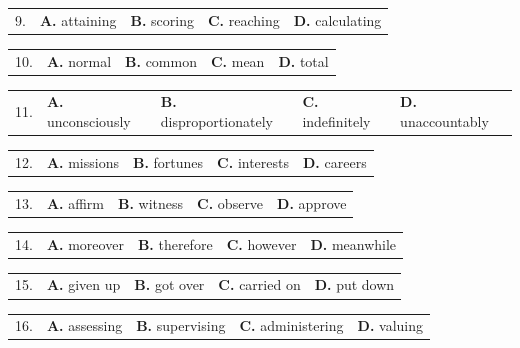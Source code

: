 \documentclass[UTF8,11pt]{ctexart}
\begin{document}
\noindent\begin{tabularx}{\linewidth}{@{}lXXXX@{}}9. & \textbf{A.} attaining & \textbf{B.} scoring & \textbf{C.} reaching & \textbf{D.} calculating\\\end{tabularx}\par

\noindent\begin{tabularx}{\linewidth}{@{}lXXXX@{}}10. & \textbf{A.} normal & \textbf{B.} common & \textbf{C.} mean & \textbf{D.} total\\\end{tabularx}\par

\noindent\begin{tabularx}{\linewidth}{@{}lXXXX@{}}11. & \textbf{A.} unconsciously & \textbf{B.} disproportionately & \textbf{C.} indefinitely & \textbf{D.} unaccountably\\\end{tabularx}\par

\noindent\begin{tabularx}{\linewidth}{@{}lXXXX@{}}12. & \textbf{A.} missions & \textbf{B.} fortunes & \textbf{C.} interests & \textbf{D.} careers\\\end{tabularx}\par

\noindent\begin{tabularx}{\linewidth}{@{}lXXXX@{}}13. & \textbf{A.} affirm & \textbf{B.} witness & \textbf{C.} observe & \textbf{D.} approve\\\end{tabularx}\par

\noindent\begin{tabularx}{\linewidth}{@{}lXXXX@{}}14. & \textbf{A.} moreover & \textbf{B.} therefore & \textbf{C.} however & \textbf{D.} meanwhile\\\end{tabularx}\par

\noindent\begin{tabularx}{\linewidth}{@{}lXXXX@{}}15. & \textbf{A.} given up & \textbf{B.} got over & \textbf{C.} carried on & \textbf{D.} put down\\\end{tabularx}\par

\noindent\begin{tabularx}{\linewidth}{@{}lXXXX@{}}16. & \textbf{A.} assessing & \textbf{B.} supervising & \textbf{C.} administering & \textbf{D.} valuing\\\end{tabularx}\par
\end{document}
